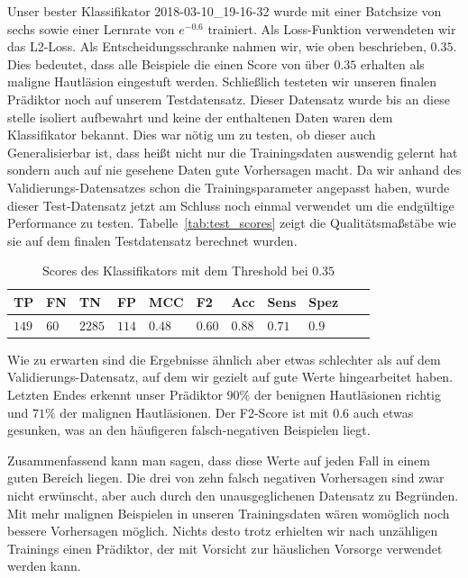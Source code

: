 Unser bester Klassifikator 2018-03-10\_19-16-32 wurde mit einer Batchsize von sechs sowie einer Lernrate von $e^{-0.6}$ trainiert. Als Loss-Funktion verwendeten wir das L2-Loss. Als Entscheidungsschranke nahmen wir, wie oben beschrieben, $0.35$. Dies bedeutet, dass alle Beispiele die einen Score von über $0.35$ erhalten als maligne Hautläsion eingestuft werden. Schließlich testeten wir unseren finalen Prädiktor noch auf unserem Testdatensatz. Dieser Datensatz wurde bis an diese stelle isoliert aufbewahrt und keine der enthaltenen Daten waren dem Klassifikator bekannt. Dies war nötig um zu testen, ob dieser auch Generalisierbar ist, dass heißt nicht nur die Trainingsdaten auswendig gelernt hat sondern auch auf nie gesehene Daten gute Vorhersagen macht. Da wir anhand des Validierungs-Datensatzes schon die Trainingsparameter angepasst haben, wurde dieser Test-Datensatz jetzt am Schluss noch einmal verwendet um die endgültige Performance zu testen. Tabelle~\ref{tab:test_scores} zeigt die Qualitätsmaßstäbe wie sie auf dem finalen Testdatensatz berechnet wurden.

\begin{table}[htb!]
\begin{center}
\begin{tabular}{lllllllllll}
	\toprule
 	TP & FN & TN & FP & MCC & F2 & Acc & Sens & Spez\\
	\midrule
    $149$&	$60$ &	$2285$ &	$114$ &	$0.48$ 	&$0.60$	&$0.88$	&$0.71$&	$0.9$ \\
 \bottomrule
 \end{tabular}
 \end{center}
  \caption{Scores des Klassifikators mit dem Threshold bei $0.35$}
 \label{tab:final_scores}
 \end{table}

 Wie zu erwarten sind die Ergebnisse ähnlich aber etwas schlechter als auf dem Validierungs-Datensatz, auf dem wir gezielt auf gute Werte hingearbeitet haben. Letzten Endes erkennt unser Prädiktor $90\%$ der benignen Hautläsionen richtig und $71\%$ der malignen Hautläsionen. Der F2-Score ist mit $0.6$ auch etwas gesunken, was an den häufigeren falsch-negativen Beispielen liegt.

 Zusammenfassend kann man sagen, dass diese Werte auf jeden Fall in einem guten Bereich liegen. Die drei von zehn falsch negativen Vorhersagen sind zwar nicht erwünscht, aber auch durch den unausgeglichenen Datensatz zu Begründen. Mit mehr malignen Beispielen in unseren Trainingsdaten wären womöglich noch bessere Vorhersagen möglich. Nichts desto trotz erhielten wir nach unzähligen Trainings einen Prädiktor, der mit Vorsicht zur häuslichen Vorsorge verwendet werden kann.